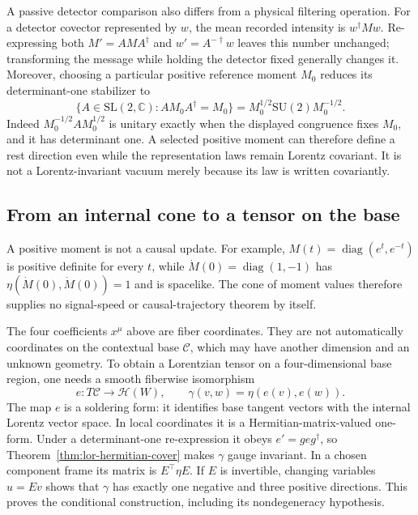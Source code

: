 A passive detector comparison also differs from a physical filtering operation. For a detector covector represented by $w$, the mean recorded intensity is $w^\dagger Mw$. Re-expressing both $M'=AMA^\dagger$ and $w'=A^{-\dagger}w$ leaves this number unchanged; transforming the message while holding the detector fixed generally changes it. Moreover, choosing a particular positive reference moment $M_0$ reduces its determinant-one stabilizer to
\begin{equation}
\{A\in\mathrm{SL}(2,\mathbb C):AM_0A^\dagger=M_0\}
=M_0^{1/2}\mathrm{SU}(2)M_0^{-1/2}.
\label{eq:lor-positive-state-stabilizer}
\end{equation}
Indeed $M_0^{-1/2}AM_0^{1/2}$ is unitary exactly when the displayed congruence fixes $M_0$, and it has determinant one. A selected positive moment can therefore define a rest direction even while the representation laws remain Lorentz covariant. It is not a Lorentz-invariant vacuum merely because its law is written covariantly.

\subsection{From an internal cone to a tensor on the base}
\label{sec:lor-soldering}

A positive moment is not a causal update. For example, $M(t)=\operatorname{diag}(e^t,e^{-t})$ is positive definite for every $t$, while $\dot M(0)=\operatorname{diag}(1,-1)$ has $\eta(\dot M(0),\dot M(0))=1$ and is spacelike. The cone of moment values therefore supplies no signal-speed or causal-trajectory theorem by itself.

The four coefficients $x^\mu$ above are fiber coordinates. They are not automatically coordinates on the contextual base $\mathcal C$, which may have another dimension and an unknown geometry. To obtain a Lorentzian tensor on a four-dimensional base region, one needs a smooth fiberwise isomorphism
\begin{equation}
e:T\mathcal C\longrightarrow\mathcal H(W),\qquad
\gamma(v,w)=\eta(e(v),e(w)).
\label{eq:lor-soldering}
\end{equation}
The map $e$ is a soldering form: it identifies base tangent vectors with the internal Lorentz vector space. In local coordinates it is a Hermitian-matrix-valued one-form. Under a determinant-one re-expression it obeys $e'=geg^\dagger$, so Theorem~\ref{thm:lor-hermitian-cover} makes $\gamma$ gauge invariant. In a chosen component frame its matrix is $E^\top\eta E$. If $E$ is invertible, changing variables $u=Ev$ shows that $\gamma$ has exactly one negative and three positive directions. This proves the conditional construction, including its nondegeneracy hypothesis.

